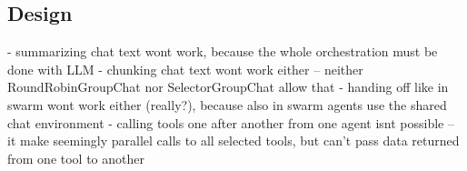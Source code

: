 \subsection{Design}

- summarizing chat text wont work, because the whole orchestration must be done with LLM
- chunking chat text wont work either -- neither RoundRobinGroupChat nor SelectorGroupChat allow that
- handing off like in swarm wont work either (really?), because also in swarm agents use the shared chat environment
- calling tools one after another from one agent isnt possible -- it make seemingly parallel calls to all selected tools, but can't pass data returned from one tool to another 